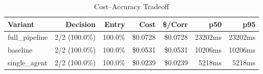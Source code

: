 \begin{table}[htbp]
\centering
\caption{Cost--Accuracy Tradeoff}
\label{tab:cost-accuracy}
\begin{tabular}{l r r rr rr}
\toprule
Variant & Decision & Entry & Cost & \$/Corr & p50 & p95 \\
\midrule
  full\_pipeline & 2/2 (100.0\%) & 100.0\% & \$0.0728 & \$0.0728 & 23202ms & 23202ms \\
  baseline & 2/2 (100.0\%) & 100.0\% & \$0.0531 & \$0.0531 & 10206ms & 10206ms \\
  single\_agent & 2/2 (100.0\%) & 100.0\% & \$0.0239 & \$0.0239 & 5218ms & 5218ms \\
\bottomrule
\end{tabular}
\end{table}

